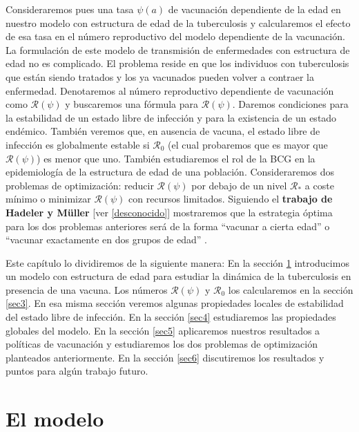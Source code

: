 \documentclass[
]{book}
\begin{document}
Consideraremos pues una tasa \(\psi(a)\) de vacunación dependiente de la edad en nuestro modelo con estructura de edad de la tuberculosis y calcularemos el efecto de esa tasa en el número reproductivo del modelo dependiente de la vacunación. La formulación de este modelo de transmisión de enfermedades con estructura de edad no es complicado. El problema reside en que los individuos con tuberculosis que están siendo tratados y los ya vacunados pueden volver a contraer la enfermedad. Denotaremos al número reproductivo dependiente de vacunación como \(\mathscr{R(\psi)}\) y buscaremos una fórmula para \(\mathscr{R(\psi)}\). Daremos condiciones para la estabilidad de un estado libre de infección y para la existencia de un estado endémico. También veremos que, en ausencia de vacuna, el estado libre de infección es globalmente estable si \(\mathscr{R}_0\) (el cual probaremos que es mayor que \(\mathscr{R(\psi)}\)) es menor que uno. También estudiaremos el rol de la BCG en la epidemiología de la estructura de edad de una población. Consideraremos dos problemas de optimización: reducir \(\mathscr{R(\psi)}\) por debajo de un nivel \(\mathscr{R}_*\) a coste mínimo o minimizar \(\mathscr{R(\psi)}\) con recursos limitados. Siguiendo el \textbf{trabajo de Hadeler y Müller} {[}ver \ref{desconocido}{]} mostraremos que la estrategia óptima para los dos problemas anteriores será de la forma ``vacunar a cierta edad'' o ``vacunar exactamente en dos grupos de edad'' .

Este capítulo lo dividiremos de la siguiente manera: En la sección \ref{sec2} introducimos un modelo con estructura de edad para estudiar la dinámica de la tuberculosis en presencia de una vacuna. Los números \(\mathscr{R(\psi)}\) y \(\mathscr{R}_0\) los calcularemos en la sección \ref{sec3}. En esa misma sección veremos algunas propiedades locales de estabilidad del estado libre de infección. En la sección \ref{sec4} estudiaremos las propiedades globales del modelo. En la sección \ref{sec5} aplicaremos nuestros resultados a políticas de vacunación y estudiaremos los dos problemas de optimización planteados anteriormente. En la sección \ref{sec6} discutiremos los resultados y puntos para algún trabajo futuro.

\hypertarget{sec2}{%
\section{El modelo}\label{sec2}}
\end{document}
